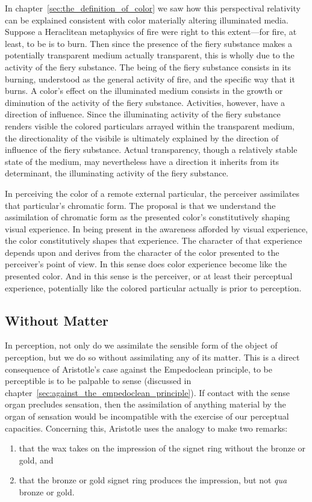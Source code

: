 In chapter~\ref{sec:the_definition_of_color} we saw how this perspectival relativity can be explained consistent with color materially altering illuminated media. Suppose a Heraclitean metaphysics of fire were right to this extent---for fire, at least, to be is to burn. Then since the presence of the fiery substance makes a potentially transparent medium actually transparent, this is wholly due to the activity of the fiery substance. The being of the fiery substance consists in its burning, understood as the general activity of fire, and the specific way that it burns. A color's effect on the illuminated medium consists in the growth or diminution of the activity of the fiery substance. Activities, however, have a direction of influence. Since the illuminating activity of the fiery substance renders visible the colored particulars arrayed within the transparent medium, the directionality of the visibile is ultimately explained by the direction of influence of the fiery substance. Actual transparency, though a relatively stable state of the medium, may nevertheless have a direction it inherits from its determinant, the illuminating activity of the fiery substance.

In perceiving the color of a remote external particular, the perceiver assimilates that particular's chromatic form. The proposal is that we understand the assimilation of chromatic form as the presented color's constitutively shaping visual experience. In being present in the awareness afforded by visual experience, the color constitutively shapes that experience. The character of that experience depends upon and derives from the character of the color presented to the perceiver's point of view. In this sense does color experience become like the presented color. And in this sense is the perceiver, or at least their perceptual experience, potentially like the colored particular actually is prior to perception.


\subsection{Without Matter} %
\label{sub:without_matter}

In perception, not only do we assimilate the sensible form of the object of perception, but we do so without assimilating any of its matter. This is a direct consequence of Aristotle's case against the Empedoclean principle, to be perceptible is to be palpable to sense (discussed in chapter~\ref{sec:against_the_empedoclean_principle}). If contact with the sense organ precludes sensation, then the assimilation of anything material by the organ of sensation would be incompatible with the exercise of our perceptual capacities. Concerning this, Aristotle uses the analogy to make two remarks:
\begin{enumerate}[(1)]
	\item that the wax takes on the impression of the signet ring without the bronze or gold, and
	\item that the bronze or gold signet ring produces the impression, but not \emph{qua} bronze or gold.
\end{enumerate}

